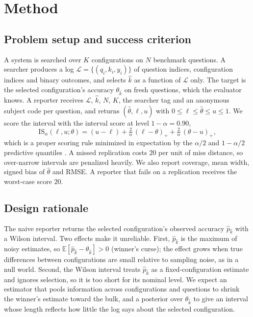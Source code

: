 \documentclass{article}
\newcommand{\IS}{\mathrm{IS}}
\begin{document}
\section{Method}\label{sec:method}
\subsection{Problem setup and success criterion}
A system is searched over $K$ configurations on $N$ benchmark questions. A searcher produces a log $\mathcal L=\{(q_i,k_i,y_i)\}$ of question indices, configuration indices and binary outcomes, and selects $\hat k$ as a function of $\mathcal L$ only. The target is the selected configuration's accuracy $\theta_{\hat k}$ on fresh questions, which the evaluator knows. A reporter receives $\mathcal L$, $\hat k$, $N$, $K$, the searcher tag and an anonymous subject code per question, and returns $(\hat\theta,\ell,u)$ with $0\le \ell\le\hat\theta\le u\le 1$. We score the interval with the interval score at level $1-\alpha=0.90$,
\begin{equation}
\IS_\alpha(\ell,u;\theta)=(u-\ell)+\tfrac{2}{\alpha}\,(\ell-\theta)_+ + \tfrac{2}{\alpha}\,(\theta-u)_+ ,
\end{equation}
which is a proper scoring rule minimized in expectation by the $\alpha/2$ and $1-\alpha/2$ predictive quantiles \citep{Gneiting2007Scoring}. A missed replication costs $20$ per unit of miss distance, so over-narrow intervals are penalized heavily. We also report coverage, mean width, signed bias of $\hat\theta$ and RMSE. A reporter that fails on a replication receives the worst-case score $20$.

\subsection{Design rationale}
The naive reporter returns the selected configuration's observed accuracy $\hat p_{\hat k}$ with a Wilson interval. Two effects make it unreliable. First, $\hat p_{\hat k}$ is the maximum of noisy estimates, so $\mathbb E[\hat p_{\hat k}-\theta_{\hat k}]>0$ (winner's curse); the effect grows when true differences between configurations are small relative to sampling noise, as in a null world. Second, the Wilson interval treats $\hat p_{\hat k}$ as a fixed-configuration estimate and ignores selection, so it is too short for its nominal level. We expect an estimator that pools information across configurations and questions to shrink the winner's estimate toward the bulk, and a posterior over $\theta_{\hat k}$ to give an interval whose length reflects how little the log says about the selected configuration.
\end{document}
